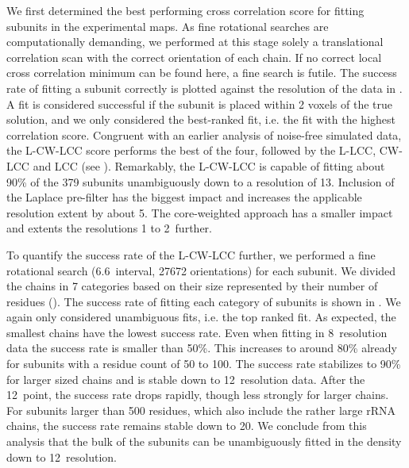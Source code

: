 

We first determined the best performing cross correlation score for fitting
subunits in the experimental maps. As fine rotational searches are
computationally demanding, we performed at this stage solely a translational
correlation scan with the correct orientation of each chain. If no correct
local cross correlation minimum can be found here, a fine search is futile. The
success rate of fitting a subunit correctly is plotted against the resolution
of the data in . A fit is considered successful if
the subunit is placed within 2 voxels of the true solution, and we only
considered the best-ranked fit, i.e. the fit with the highest correlation
score. Congruent with an earlier analysis of noise-free simulated data, the
L-CW-LCC score performs the best of the four, followed by the L-LCC, CW-LCC and
LCC (see ).  Remarkably, the L-CW-LCC is capable of
fitting about 90\% of the 379 subunits unambiguously down to a resolution of
13\Angstrom. Inclusion of the Laplace pre-filter has the biggest impact and
increases the applicable resolution extent by about 5\Angstrom. The
core-weighted approach has a smaller impact and extents the resolutions 1 to
2\Angstrom\ further. 

{}



To quantify the success rate of the L-CW-LCC further, we performed a fine
rotational search (6.6\Deg\ interval, 27672 orientations) for each subunit.  We
divided the chains in 7 categories based on their size represented by their
number of residues (). The success rate of fitting
each category of subunits is shown in . We again
only considered unambiguous fits, i.e.  the top ranked fit. As expected, the
smallest chains have the lowest success rate. Even when fitting in 8\Angstrom\
resolution data the success rate is smaller than 50\%. This increases to around
80\% already for subunits with a residue count of 50 to 100. The success rate
stabilizes to 90\% for larger sized chains and is stable down to 12\Angstrom\
resolution data. After the 12\Angstrom\ point, the success rate drops rapidly,
though less strongly for larger chains. For subunits larger than 500 residues,
which also include the rather large rRNA chains, the success rate remains
stable down to 20\Angstrom.  We conclude from this analysis that the bulk of
the subunits can be unambiguously fitted in the density down to 12\Angstrom\
resolution. 

